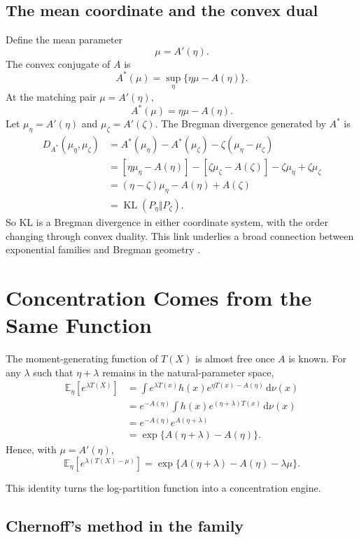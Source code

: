 \documentclass[en,nofont,11pt]{elegantbook}
\newcommand{\E}{\mathbb{E}}
\newcommand{\KL}{\operatorname{KL}}
\newcommand{\dd}{\mathrm{d}}
\begin{document}
\section{The mean coordinate and the convex dual}

Define the mean parameter
\[
\mu=A'(\eta).
\]
The convex conjugate of $A$ is
\[
A^*(\mu)=\sup_\eta\{\eta\mu-A(\eta)\}.
\]
At the matching pair $\mu=A'(\eta)$,
\[
A^*(\mu)=\eta\mu-A(\eta).
\]
Let $\mu_\eta=A'(\eta)$ and $\mu_\zeta=A'(\zeta)$. The Bregman divergence generated by $A^*$ is
\begin{align*}
D_{A^*}(\mu_\eta,\mu_\zeta)
&=A^*(\mu_\eta)-A^*(\mu_\zeta)
-\zeta(\mu_\eta-\mu_\zeta)\\
&=[\eta\mu_\eta-A(\eta)]-[\zeta\mu_\zeta-A(\zeta)]
-\zeta\mu_\eta+\zeta\mu_\zeta\\
&=(\eta-\zeta)\mu_\eta-A(\eta)+A(\zeta)\\
&=\KL(P_\eta\Vert P_\zeta).
\end{align*}
So KL is a Bregman divergence in either coordinate system, with the order changing through convex duality. This link underlies a broad connection between exponential families and Bregman geometry \cite{banerjee2005bregman,wainwright2008graphical}.

\chapter{Concentration Comes from the Same Function}

The moment-generating function of $T(X)$ is almost free once $A$ is known. For any $\lambda$ such that $\eta+\lambda$ remains in the natural-parameter space,
\begin{align*}
\E_\eta[e^{\lambda T(X)}]
&=\int e^{\lambda T(x)}h(x)e^{\eta T(x)-A(\eta)}\,\dd\nu(x)\\
&=e^{-A(\eta)}\int h(x)e^{(\eta+\lambda)T(x)}\,\dd\nu(x)\\
&=e^{-A(\eta)}e^{A(\eta+\lambda)}\\
&=\exp\{A(\eta+\lambda)-A(\eta)\}.
\end{align*}
Hence, with $\mu=A'(\eta)$,
\begin{equation}
\boxed{
\E_\eta[e^{\lambda(T(X)-\mu)}]
=
\exp\{A(\eta+\lambda)-A(\eta)-\lambda\mu\}.
}
\label{eq:centered-mgf}
\end{equation}

This identity turns the log-partition function into a concentration engine.

\section{Chernoff's method in the family}
\end{document}
